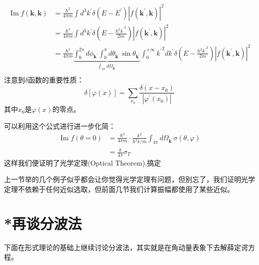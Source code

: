 \documentclass[a4paper,zihao=-4,linespread=1]{ctexrep}
\newcommand\qed[0]{\hfill$\boxed{\text{搞定}}$}
\begin{document}
	\begin{equation}
		\begin{aligned}
			\operatorname{Im}f(\mathbf{k},\mathbf{k})&=\frac{\hbar^2}{4\pi m}\int d^3k^\prime\delta(E-E^\prime)\left|f(\mathbf{k}^\prime,\mathbf{k})\right|^2\\
			&=\frac{\hbar^2}{4\pi m}\int d^3k^\prime\delta\left(E-\frac{\hbar^2{k^\prime}^2}{2m}\right)\left|f(\mathbf{k}^\prime,\mathbf{k})\right|^2\\
			&=\frac{\hbar^2}{4\pi m}\underbrace{\int_0^{2\pi}d\phi_{\mathbf{k}^\prime}\int_0^\pi d\theta_{\mathbf{k}^\prime}\sin\theta_{\mathbf{k}^\prime}}_{\int_{4\pi}d\Omega_{\mathbf{k}^\prime}} \int_0^{+\infty} {k^\prime}^2dk^\prime\delta\left(E-\frac{\hbar^2{k^\prime}^2}{2m}\right)\left|f(\mathbf{k}^\prime,\mathbf{k})\right|^2\\
		\end{aligned}
	\end{equation}
	注意到$\delta$函数的重要性质：
	\begin{equation}
		\delta\left[\varphi(x)\right]=\sum_{x_0}\frac{\delta(x-x_0)}{|\varphi^\prime(x_0)|}
	\end{equation}
	其中$x_0$是$\varphi(x)$的零点。
	
	可以利用这个公式进行进一步化简：
	\begin{equation}
		\begin{aligned}
			\operatorname{Im}f(\theta=0)&=\frac{\hbar^2}{4\pi m}\cdot\frac{k^2}{\hbar^2k/m}\int_{4\pi}d\Omega_{\mathbf{k}^\prime}\sigma(\theta,\varphi)\\
			&=\frac{k}{4\pi}\sigma_T
		\end{aligned}
	\end{equation}
	这样我们便证明了光学定理(Optical Theorem).\qed
	
	上一节举的几个例子似乎都会让你觉得光学定理有问题，但别忘了，我们证明光学定理不依赖于任何近似选取，但前面几节我们计算振幅都使用了某些近似。
	
	\section{*再谈分波法}
	下面在形式理论的基础上继续讨论分波法，其实就是在角动量表象下去解薛定谔方程。
\end{document}
